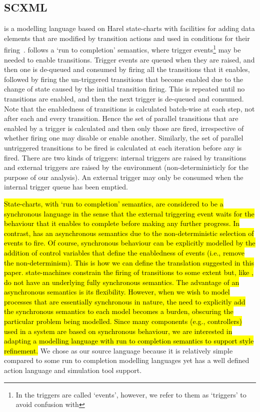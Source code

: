 
\subsection{SCXML}
\label{sec:scxml}

\SCXML is a modelling language based on Harel state-charts with facilities for adding data elements that are modified by transition actions and used in conditions for their firing~\cite{scxmlwebsite}. 
\SCXML follows a `run to completion' semantics, where trigger events\footnote{In \SCXML the triggers are called `events', however, we refer to them as `triggers' to avoid confusion with \EventB} may be needed to enable transitions.
Trigger events are queued when they are raised, and then one is de-queued and consumed by firing all the transitions that it enables, followed by firing the un-triggered transitions that become enabled due to the change of state caused by the initial transition firing.
This is repeated until no transitions are enabled, and then the next trigger is de-queued and consumed.
Note that the enabledness of transitions is calculated batch-wise at each step, not after each and every transition.
Hence the set of parallel transitions that are enabled by a trigger is calculated and then only those are fired, irrespective of whether firing one may disable or enable another.
Similarly, the set of parallel untriggered transitions to be fired is calculated at each iteration before any is fired.
There are two kinds of triggers: internal triggers are raised by transitions and external triggers are raised by the environment (non-deterministicly for the purpose of our analysis). 
An external trigger may only be consumed when the internal trigger queue has been emptied.

\hl{
State-charts, with `run to completion' semantics, are considered to be a synchronous language in the sense that the external triggering event waits for the behaviour that it enables to complete before making any further progress.
In contrast, \mbox{\EventB} has an asynchronous semantics due to the non-deterministic selection of events to fire. 
Of course, synchronous behaviour can be explicitly modelled by the addition of control variables that define the enabledness of events (i.e., remove the non-determinism).
This is how we can define the translation suggested in this paper.
\mbox{\UMLB} state-machines constrain the firing of transitions to some extent but, like \mbox{\EventB}, do not have an underlying fully synchronous semantics.
The advantage of an asynchronous semantics is its flexibility.
However, when we wish to model processes that are essentially synchronous in nature, the need to explicitly add the synchronous semantics to each model becomes a burden, obscuring the particular problem being modelled.
Since many components (e.g., controllers) used in a system are based on synchronous behaviour, we are interested in adapting a modelling language with run to completion semantics to support \mbox{\EventB} style refinement.
}
We chose \SCXML as our source language because it is relatively simple compared to some run to completion modelling languages yet has a well defined action language and simulation tool support.


